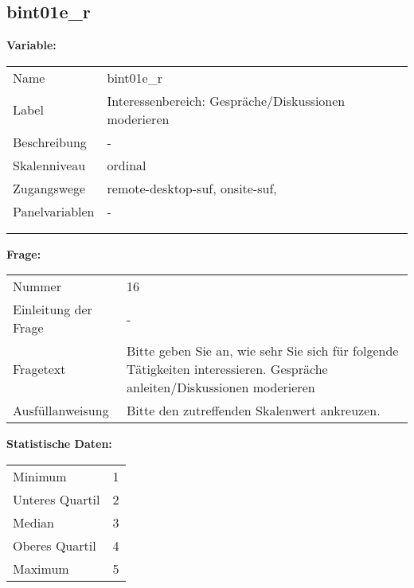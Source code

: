	
	
	\subsection{bint01e\_r}
	\label{subSection:bint01e_r}

	\noindent\textbf{Variable:}\\
		\begin{tabular}{lL{11.3cm}}
			\label{tableVariable:bint01e_r}
			Name & bint01e\_r \\
			Label & Interessenbereich: Gespräche/Diskussionen moderieren \\
			Beschreibung & - \\
			Skalenniveau & ordinal \\
			Zugangswege &
				remote-desktop-suf,
				onsite-suf,
 \\
			Panelvariablen & -
			 \\
			 \\
 \\
		\end{tabular}

		\vspace*{1 cm}
		\noindent\textbf{Frage:}\\
		\begin{tabular}{lL{11.3cm}}
			\label{tableQuestion:bint01e_r}
			Nummer & 16 \\
			Einleitung der Frage & - \\
			Fragetext & Bitte geben Sie an, wie sehr Sie sich für folgende Tätigkeiten interessieren.
Gespräche anleiten/Diskussionen moderieren \\
			Ausfüllanweisung & Bitte den zutreffenden Skalenwert ankreuzen. \\
		\end{tabular}


		\vspace*{1 cm}
		\noindent\textbf{Statistische Daten:}\\
			\begin{tabular}{ll}
				\label{tableStatistics:bint01e_r}
					Minimum & 1 \\
					Unteres Quartil & 2 \\
					Median & 3 \\
					Oberes Quartil & 4 \\
					Maximum & 5 \\
			\end{tabular}



